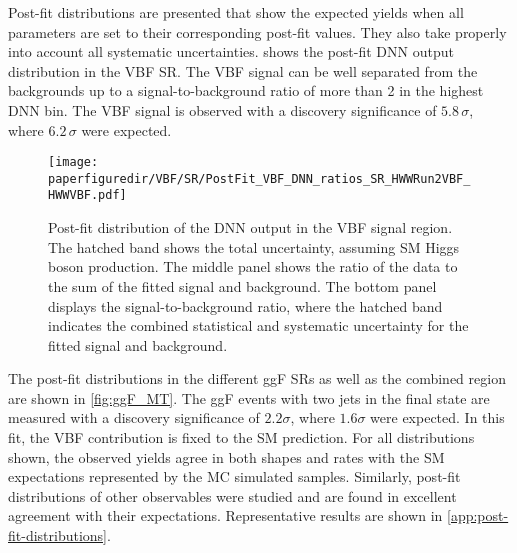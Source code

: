 Post-fit distributions are presented that show the expected yields when all parameters are set to their corresponding post-fit values. They also take properly into account all systematic uncertainties.  shows the post-fit DNN output distribution in the VBF SR.
The VBF signal can be well separated from the backgrounds up to a signal-to-background ratio of more than 2 in the highest DNN bin. 
The VBF signal is observed with a discovery significance of $5.8\,\sigma$, where $6.2\,\sigma$ were expected.
\begin{figure}[htb]
  \centering
  \texttt{[image: \\paperfiguredir/VBF/SR/PostFit\_VBF\_DNN\_ratios\_SR\_HWWRun2VBF\_HWWVBF.pdf]}
  \caption{
    Post-fit distribution of the DNN output in the VBF signal region.
    The hatched band shows the total uncertainty, assuming SM Higgs boson production.
    The middle panel shows the ratio of the data to the sum of the fitted signal and background.
    The bottom panel displays the signal-to-background ratio, where the hatched band indicates the combined statistical and systematic uncertainty for the fitted signal and background.
  }
  \label{fig:VBF_DNN}
  \end{figure}
The post-fit \mT distributions in the different ggF SRs as well as the combined region are shown in \cref{fig:ggF_MT}.
The ggF events with two jets in the final state are measured with a discovery significance of $2.2\sigma$, where $1.6\sigma$ were expected. In this fit, the VBF contribution is fixed to the SM prediction.
For all distributions shown, the observed yields agree in both shapes and rates with the SM expectations represented by the MC simulated samples. 
Similarly, post-fit distributions of other observables were studied and are found in excellent agreement with their expectations. Representative results are shown in \cref{app:post-fit-distributions}. 

